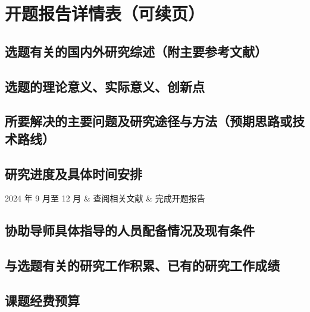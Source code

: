 \documentclass{fdu-proposal}
\begin{document}
\setcounter{chapter}{2}
\chapter{开题报告详情表（可续页）}

\section{选题有关的国内外研究综述（附主要参考文献）}


\section{选题的理论意义、实际意义、创新点}

\section{所要解决的主要问题及研究途径与方法（预期思路或技术路线）}

\section{研究进度及具体时间安排}

\begin{schedule}
  2024 年 9 月至 12 月 & 查阅相关文献 & 完成开题报告
\end{schedule}


\section{协助导师具体指导的人员配备情况及现有条件}

\section{与选题有关的研究工作积累、已有的研究工作成绩}

\section{课题经费预算}
\end{document}
